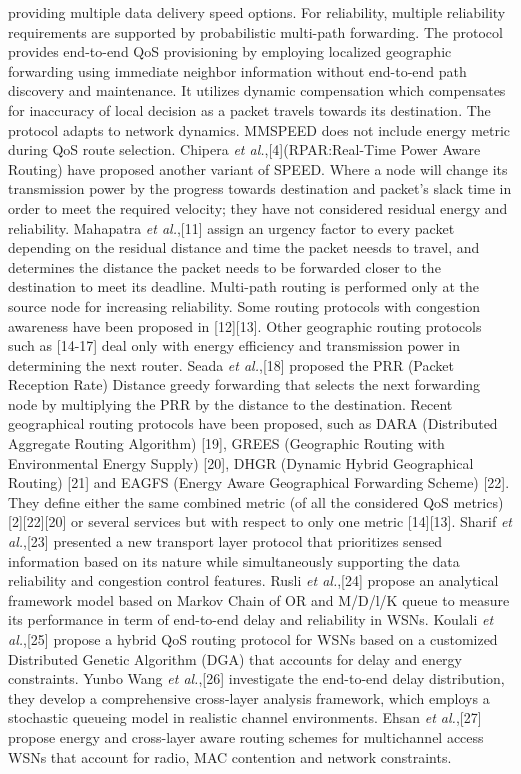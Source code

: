 \documentclass[fleqn,twoside]{article}
\begin{document}
providing multiple data delivery speed options. For reliability, multiple reliability requirements are supported by probabilistic multi-path forwarding. The protocol provides end-to-end QoS provisioning by employing localized geographic forwarding using immediate neighbor information without end-to-end path discovery and maintenance. It utilizes dynamic compensation which compensates for inaccuracy of local decision as a packet travels towards its destination. The protocol adapts to network dynamics. MMSPEED does not include energy metric during QoS route selection.  Chipera \emph{et al.},[4](RPAR:Real-Time Power Aware Routing) have proposed another variant of SPEED. Where a node will change its transmission power by the progress towards destination and packet's slack time in order to meet the required velocity; they have not considered residual energy and reliability. 
\vskip 2mm
Mahapatra \emph{et al.},[11] assign an urgency factor to every packet depending on the residual distance and time the packet neesds to travel, and determines the distance the packet needs to be forwarded closer to the destination to meet its deadline. Multi-path routing is performed only at the source node for increasing reliability. Some routing protocols with congestion awareness have been proposed in [12][13]. Other geographic routing protocols such as [14-17] deal only with energy efficiency
and transmission power in determining the next router. Seada \emph{et al.},[18] proposed the PRR (Packet Reception Rate)  Distance greedy forwarding 
that selects the next forwarding node by multiplying the PRR by the distance to the destination. Recent geographical routing protocols have been proposed, such as DARA (Distributed Aggregate Routing Algorithm) [19], GREES (Geographic Routing with Environmental Energy Supply) [20], DHGR (Dynamic Hybrid Geographical Routing) [21] and EAGFS (Energy Aware Geographical Forwarding Scheme) [22]. They define either the same combined metric (of all the considered QoS metrics) [2][22][20] or several services but with respect to only one metric [14][13].
\vskip 2mm
Sharif \emph{et al.},[23] presented a new transport layer protocol that prioritizes sensed information based on its nature while simultaneously supporting the data reliability and congestion control features. Rusli \emph{et al.},[24] propose an analytical framework model based on Markov Chain of OR and M/D/l/K queue to measure its performance in term of end-to-end delay and reliability in WSNs. 
Koulali \emph{et al.},[25] propose a hybrid QoS routing protocol for WSNs based on a customized Distributed Genetic Algorithm (DGA) that accounts for delay and energy constraints. Yunbo Wang \emph{et al.},[26] investigate the end-to-end delay distribution, they develop a comprehensive cross-layer analysis framework, which employs a stochastic queueing model in realistic channel environments. Ehsan \emph{et al.},[27] propose energy and cross-layer aware routing schemes for multichannel access WSNs that account for radio, MAC contention and network constraints.
\end{document}
